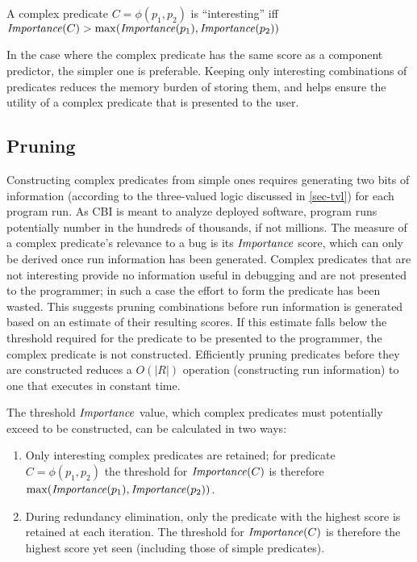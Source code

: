 \begin{defn}
\label{dfn3}
A complex predicate $C = \phi(p_1, p_2)$ is ``interesting'' iff $\mathit{Importance}(C) > \max(\mathit{Importance}(p_1), \mathit{Importance}(p_2))$
\end{defn}

In the case where the complex predicate has the same score as a component predictor, the simpler one is preferable.  Keeping only interesting combinations of predicates reduces the memory burden of storing them, and helps ensure the utility of a complex predicate that is presented to the user.

\subsection{Pruning}
\label{sec-pruning}
Constructing complex predicates from simple ones requires generating two bits of information (according to the three-valued logic discussed in \autoref{sec-tvl}) for each program run.  As CBI is meant to analyze deployed software, program runs potentially number in the hundreds of thousands, if not millions.  The measure of a complex predicate's relevance to a bug is its $\mathit{Importance}$ score, which can only be derived once run information has been generated.  Complex predicates that are not interesting provide no information useful in debugging and are not presented to the programmer; in such a case the effort to form the predicate has been wasted.  This suggests pruning combinations before run information is generated based on an estimate of their resulting scores.  If this estimate falls below the threshold required for the predicate to be presented to the programmer, the complex predicate is not constructed.  Efficiently pruning predicates before they are constructed reduces a $O(|R|)$ operation (constructing run information) to one that executes in constant time.

The threshold $\mathit{Importance}$ value, which complex predicates must potentially exceed to be constructed, can be calculated in two ways:
\begin{enumerate}
\item Only interesting complex predicates are retained; for predicate $C = \phi(p_1, p_2)$ the threshold for $\mathit{Importance}(C)$ is therefore $\max(\mathit{Importance}(p_1), \mathit{Importance}(p_2))$.
\item During redundancy elimination, only the predicate with the highest score is retained at each iteration.  The threshold for $\mathit{Importance}(C)$ is therefore the highest score yet seen (including those of simple predicates).
\end{enumerate}

